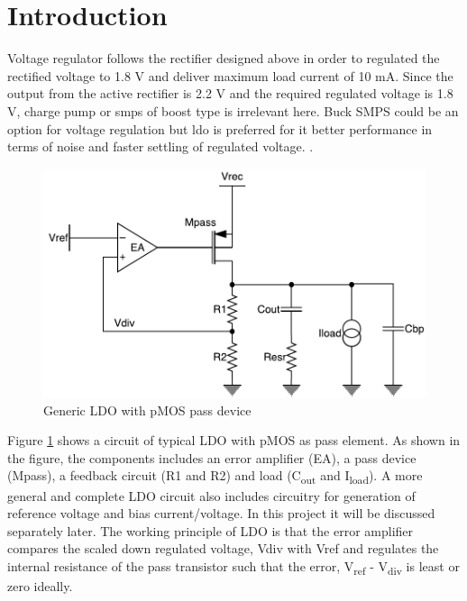 \documentclass[12pt,a4paper,UKenglish]{report}
\begin{document}
\section{Introduction}		%

Voltage regulator follows the rectifier designed above in order to regulated the rectified voltage to 1.8 V and 
deliver maximum load current of 10 mA. Since the output from the active rectifier is 2.2 V and the required 
regulated voltage is 1.8 V, charge pump or  \acrshort{smps} of boost type is irrelevant here. Buck SMPS could be 
an option for voltage regulation but  \acrshort{ldo} is preferred for it better performance in terms of noise and faster 
settling of regulated voltage.  \cite{ldo_psu}.\\ 

\begin{figure}[htbp] %
   \centering
   \includegraphics[width=\textwidth]{img/ldo.pdf} 
   \caption{Generic LDO with pMOS pass device}
   \label{ldo_gen}
\end{figure}

Figure \ref{ldo_gen} shows a circuit of typical LDO with pMOS as pass element. As shown in the figure, the 
components includes an error amplifier (EA), a pass device (Mpass), a feedback circuit (R1 and R2) and load 
(C\textsubscript{out} and I\textsubscript{load}). A more general and complete LDO circuit also includes 
circuitry for generation of reference voltage and bias current/voltage. In this project it will be discussed 
separately later. The working principle of LDO is that the error amplifier compares the scaled down regulated 
voltage, Vdiv with Vref and regulates the internal resistance of the pass transistor such that  the error, 
V\textsubscript{ref} - V\textsubscript{div} is least or zero ideally. \\
\end{document}
